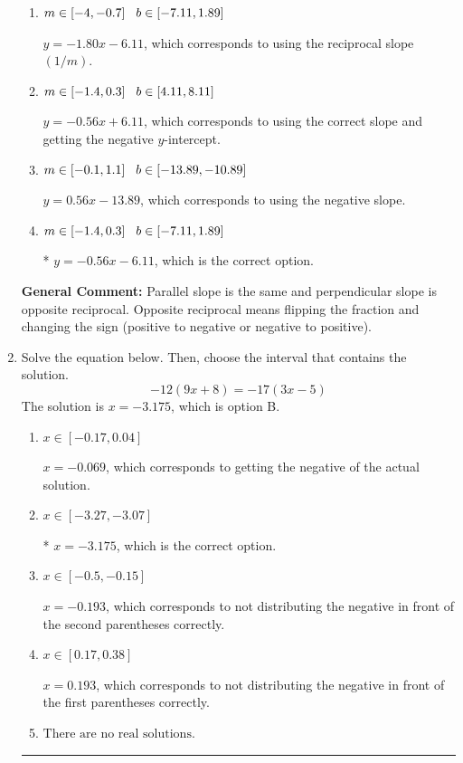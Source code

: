 \documentclass{extbook}[14pt]
\newcommand{\litem}[1]{\item #1

\rule{\textwidth}{0.4pt}}
\begin{document}
\begin{enumerate}
{\begin{enumerate}[label=\Alph*.]
 $y = -0.56x - 17.00$, which corresponds to correct slope and mis-distributing while simplifying to slope-intercept form.
\item \( m \in [-4, -0.7] \hspace*{3mm} b \in [-7.11, 1.89] \)

 $y = -1.80x - 6.11$, which corresponds to using the reciprocal slope $(1/m)$.
\item \( m \in [-1.4, 0.3] \hspace*{3mm} b \in [4.11, 8.11] \)

 $y = -0.56x + 6.11$, which corresponds to using the correct slope and getting the negative $y$-intercept.
\item \( m \in [-0.1, 1.1] \hspace*{3mm} b \in [-13.89, -10.89] \)

 $y = 0.56x - 13.89$, which corresponds to using the negative slope.
\item \( m \in [-1.4, 0.3] \hspace*{3mm} b \in [-7.11, 1.89] \)

* $y = -0.56x - 6.11$, which is the correct option.
\end{enumerate}

\textbf{General Comment:} Parallel slope is the same and perpendicular slope is opposite reciprocal. Opposite reciprocal means flipping the fraction and changing the sign (positive to negative or negative to positive).
}
\litem{
Solve the equation below. Then, choose the interval that contains the solution.
\[ -12(9x + 8) = -17(3x -5) \]The solution is \( x = -3.175 \), which is option B.\begin{enumerate}[label=\Alph*.]
\item \( x \in [-0.17, 0.04] \)

$x = -0.069$, which corresponds to getting the negative of the actual solution.
\item \( x \in [-3.27, -3.07] \)

* $x = -3.175$, which is the correct option.
\item \( x \in [-0.5, -0.15] \)

$x = -0.193$, which corresponds to not distributing the negative in front of the second parentheses correctly.
\item \( x \in [0.17, 0.38] \)

$x = 0.193$, which corresponds to not distributing the negative in front of the first parentheses correctly.
\item \( \text{There are no real solutions.} \)


\end{enumerate}}
\end{enumerate}
\end{document}
